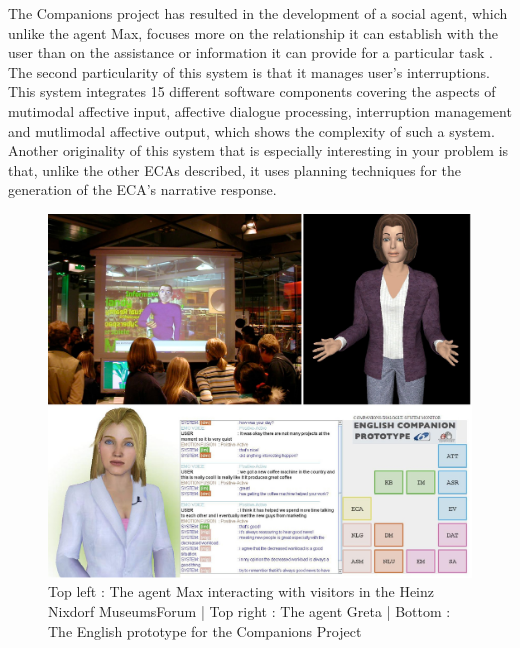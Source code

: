 \documentclass[11pt]{article}
\begin{document}
The Companions project has resulted in the development of a social agent,  which unlike the agent Max, focuses more on the relationship it can establish with the user than on the assistance or information it can provide for a particular task \citep{Smith11}. The second particularity of this system is that it manages user's interruptions. This system integrates 15 different software components covering the aspects of mutimodal affective input, affective dialogue processing, interruption management and mutlimodal affective output, which shows the complexity of such a system. Another originality of this system that is especially interesting in your problem is that, unlike the other ECAs described, it uses planning techniques for the generation of the ECA's narrative response.
\begin{figure}[!h]
   	\centerline{\includegraphics[scale=0.3]{./images/ECAs}}
   	\caption{\label{Figure ECAs} Top left : The agent Max interacting with visitors in the Heinz Nixdorf MuseumsForum \citep{Kopp05} | Top right : The agent Greta \citep{Pelachaud05} | Bottom : The English prototype for the Companions Project\citep{Smith11}}
\end{figure}
\end{document}

